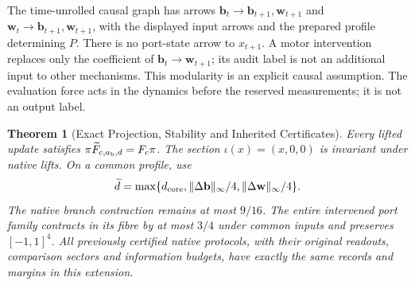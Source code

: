 \documentclass[11pt,a4paper]{article}
\newtheorem{theorem}{Theorem}[section]
\theoremstyle{definition}
\begin{document}
The time-unrolled causal graph has arrows $\mathbf b_t\to\mathbf b_{t+1},\mathbf w_{t+1}$ and $\mathbf w_t\to\mathbf b_{t+1},\mathbf w_{t+1}$, with the displayed input arrows and the prepared profile determining $P$. There is no port-state arrow to $x_{t+1}$. A motor intervention replaces only the coefficient of $\mathbf b_t\to\mathbf w_{t+1}$; its audit label is not an additional input to other mechanisms. This modularity is an explicit causal assumption. The evaluation force acts in the dynamics before the reserved measurements; it is not an output label.

\begin{theorem}[Exact Projection, Stability and Inherited Certificates]\label{thm:bridge-port-preservation}
Every lifted update satisfies $\pi\widetilde F_{c,a_{\rm b},d}=F_c\pi$. The section $\iota(x)=(x,0,0)$ is invariant under native lifts. On a common profile, use
\[
 \widetilde d=\max\{d_{\rm core},\|\Delta\mathbf b\|_\infty/4,
                                      \|\Delta\mathbf w\|_\infty/4\}.
\]
The native branch contraction remains at most $9/16$. The entire intervened port family contracts in its fibre by at most $3/4$ under common inputs and preserves $[-1,1]^4$. All previously certified native protocols, with their original readouts, comparison sectors and information budgets, have exactly the same records and margins in this extension.
\end{theorem}
\end{document}
